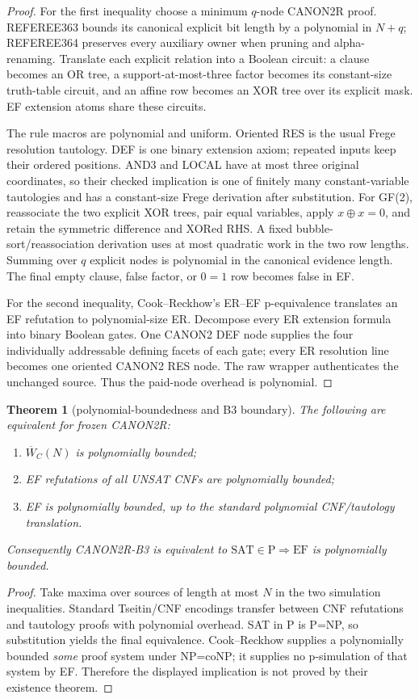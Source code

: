 \documentclass[11pt]{article}
\newtheorem{theorem}{Theorem}
\begin{document}
\begin{proof}
For the first inequality choose a minimum $q$-node CANON2R proof.  REFEREE363
bounds its canonical explicit bit length by a polynomial in $N+q$; REFEREE364
preserves every auxiliary owner when pruning and alpha-renaming.  Translate
each explicit relation into a Boolean circuit: a clause becomes an OR tree, a
support-at-most-three factor becomes its constant-size truth-table circuit, and
an affine row becomes an XOR tree over its explicit mask.  EF extension atoms
share these circuits.

The rule macros are polynomial and uniform.  Oriented RES is the usual Frege
resolution tautology.  DEF is one binary extension axiom; repeated inputs keep
their ordered positions.  AND3 and LOCAL have at most three original
coordinates, so their checked implication is one of finitely many
constant-variable tautologies and has a constant-size Frege derivation after
substitution.  For GF(2), reassociate the two explicit XOR trees, pair equal
variables, apply $x\oplus x=0$, and retain the symmetric difference and XORed
RHS.  A fixed bubble-sort/reassociation derivation uses at most quadratic work
in the two row lengths.  Summing over $q$ explicit nodes is polynomial in the
canonical evidence length.  The final empty clause, false factor, or $0=1$
row becomes false in EF.

For the second inequality, Cook--Reckhow's ER--EF p-equivalence translates an
EF refutation to polynomial-size ER.  Decompose every ER extension formula
into binary Boolean gates.  One CANON2 DEF node supplies the four individually
addressable defining facets of each gate; every ER resolution line becomes one
oriented CANON2 RES node.  The raw wrapper authenticates the unchanged source.
Thus the paid-node overhead is polynomial.
\end{proof}

\begin{theorem}[polynomial-boundedness and B3 boundary]
The following are equivalent for frozen CANON2R:
\begin{enumerate}
\item $\overline W_C(N)$ is polynomially bounded;
\item EF refutations of all UNSAT CNFs are polynomially bounded;
\item EF is polynomially bounded, up to the standard polynomial CNF/tautology
translation.
\end{enumerate}
Consequently CANON2R-B3 is equivalent to
$\mathrm{SAT}\in\mathrm P\Rightarrow\mathrm{EF}$ is polynomially bounded.
\end{theorem}
\begin{proof}
Take maxima over sources of length at most $N$ in the two simulation
inequalities.  Standard Tseitin/CNF encodings transfer between CNF
refutations and tautology proofs with polynomial overhead.  SAT in P is P=NP,
so substitution yields the final equivalence.  Cook--Reckhow supplies a
polynomially bounded \emph{some} proof system under NP=coNP; it supplies no
p-simulation of that system by EF.  Therefore the displayed implication is
not proved by their existence theorem.
\end{proof}
\end{document}
